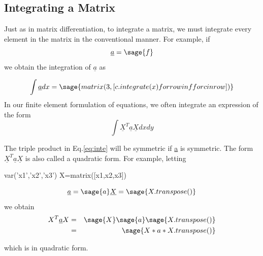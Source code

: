 \documentclass[12pt]{report}
\newcommand{\lab}[1]{
	Eq.\ref{#1}
}
\begin{document}

\subsection{Integrating a Matrix}

Just as in matrix differentiation, to integrate a matrix, we must
integrate every element in the matrix in the conventional manner. For
example, if
$$ \underline{a} = \sage{f}$$
we obtain the integration of $\underline{a}$ as

$$\int \underline{a}dx = \sage{matrix(3,[c.integrate(x) for row in f for c in row ])
}$$
In our finite element formulation of equations, we often integrate an
expression of the form
\begin{equation}
	\int \underline{X}^T\underline{a}\underline{X} dx dy 
	\label{eq:inte}
\end{equation}

The triple product in \lab{eq:inte} will be symmetric 
if \underline{a} is symmetric. The form 
$\underline{X}^T\underline{a}\underline{X}$ is also called
a quadratic form. For
example, letting
\begin{sagesilent}
	var('x1','x2','x3')
	X=matrix([x1,x2,x3])
\end{sagesilent}

$$\underline{a} = \sage{a} \underline{X}= \sage{X.transpose()}$$
we obtain
\begin{eqnarray}
	{X}^T\underline{a}{X} &=& \sage{X}\sage{a}\sage{X.transpose()} \nonumber\\
	&=&\sage{X*a*X.transpose()} 
\end{eqnarray}

which is in quadratic form.

\end{document}
